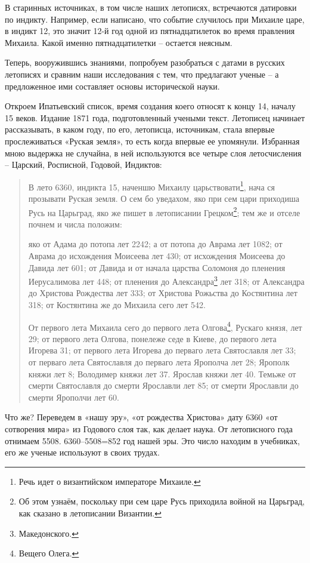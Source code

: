 В старинных источниках, в том числе наших летописях, встречаются датировки по индикту. Например, если написано, что событие случилось при Михаиле царе, в индикт 12, это значит 12-й год одной из пятнадцатилеток во время правления Михаила. Какой именно пятнадцатилетки – остается неясным.
 
Теперь, вооружившись знаниями, попробуем разобраться с датами в русских летописях и сравним наши исследования с тем, что предлагают ученые – а предложенное ими составляет основы исторической науки.

Откроем Ипатьевский список, время создания коего относят к концу 14, началу 15 веков. Издание 1871 года, подготовленный учеными текст. Летописец начинает рассказывать, в каком году, по его, летописца, источникам, стала впервые прослеживаться «Руская земля», то есть когда впервые ее упомянули. Избранная мною выдержка не случайна, в ней используются все четыре слоя летосчисления – Царский, Росписной, Годовой, Индиктов:

\begin{quotation}
В лето 6360, индикта 15, наченшю Михаилу царьствовати\footnote{Речь идет о византийском императоре Михаиле.}, нача ся прозывати Руская земля. О сем бо уведахом, яко при сем цари приходиша Русь на Царьград, яко же пишет в летописании Грецком\footnote{Об этом узнаём, поскольку при сем царе Русь приходила войной на Царьград, как сказано в летописании Византии.}; тем же и отселе почнем и числа положим:

яко от Адама до потопа лет 2242; а от потопа до Аврама лет 1082; от Аврама до исхождения Моисеева лет 430; от исхождения Моисеева до Давида лет 601; от Давида и от начала царства Соломоня до пленения Иерусалимова лет 448; от пленения до Александра\footnote{Македонского.} лет 318; от Александра до Христова Рождества лет 333; от Христова Рожьства до Костянтина лет 318; от Костянтина же до Михаила сего лет 542.

От первого лета Михаила сего до первого лета Олгова\footnote{Вещего Олега.}, Рускаго князя, лет 29; от первого лета Олгова, понележе седе в Киеве, до первого лета Игорева 31; от первого лета Игорева до перваго лета Святославля лет 33; от перваго лета Святославля до перваго лета Ярополча лет 28; Ярополк княжи лет 8; Володимер княжи лет 37. Ярослав княжи лет 40. Темьже от смерти Святославля до смерти Ярославли лет 85; от смерти Ярославли до смерти Ярополчи лет 60.
\end{quotation}

Что же? Переведем в «нашу эру», «от рождества Христова» дату 6360 «от сотворения мира» из Годового слоя так, как делает наука. От летописного года отнимаем 5508. 6360–5508=852 год нашей эры. Это число находим в учебниках, его же ученые используют в своих трудах.

